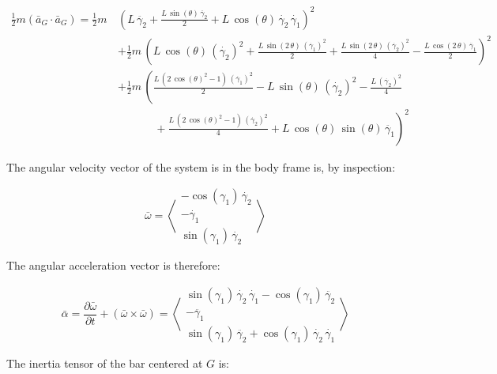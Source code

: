 \documentclass[12pt, letterpaper]{../assignment}
\begin{document}
\begin{equation*}
  \begin{aligned}
    \frac{1}{2}m \left(\bar{a}_G \cdot \bar{a}_G \right) =
\frac{1}{2}m\,&{\left(L\,\ddot{\gamma_2}+\frac{L\,\sin\left(\theta \right)\,\ddot{\gamma_2}}{2}+L\,\cos\left(\theta \right)\,\dot{\gamma_2}\,\dot{\gamma_1}\right)}^2 \\
&+{\frac{1}{2}m\,\left(L\,\cos\left(\theta \right)\,{\left(\dot{\gamma_2}\right)}^2+\frac{L\,\sin\left(2\,\theta \right)\,{\left(\dot{\gamma_1}\right)}^2}{2}+\frac{L\,\sin\left(2\,\theta \right)\,{\left(\dot{\gamma_2}\right)}^2}{4}-\frac{L\,\cos\left(2\,\theta \right)\,\ddot{\gamma_1}}{2}\right)}^2\\
&+\frac{1}{2}m\,\left(\frac{L\,\left(2\,{\cos\left(\theta \right)}^2-1\right)\,{\left(\dot{\gamma_1}\right)}^2}{2}-L\,\sin\left(\theta \right)\,{\left(\dot{\gamma_2}\right)}^2-\frac{L\,{\left(\dot{\gamma_2}\right)}^2}{4}\right.\\
&\ \ \ \ \ \ \ \ \ \ \ \ \ \ \ +\left.\frac{L\,\left(2\,{\cos\left(\theta \right)}^2-1\right)\,{\left(\dot{\gamma_2}\right)}^2}{4}+L\,\cos\left(\theta \right)\,\sin\left(\theta \right)\,\ddot{\gamma_1}\right)^2
\end{aligned}
\end{equation*}

The angular velocity vector of the system is in the body frame is, by inspection:

$$ \bar{\omega} = \left<\begin{array}{c} -\cos\left(\gamma _{1}\right)\,\dot{\gamma_2}\\ -\dot{\gamma_1}\\ \sin\left(\gamma _{1}\right)\,\dot{\gamma_2} \end{array}\right> $$

The angular acceleration vector is therefore:

$$ \bar{\alpha} = \frac{\partial \bar{\omega}}{\partial t} + \left( \bar{\omega} \times \bar{\omega} \right) =
\left<\begin{array}{c} \sin\left(\gamma _{1}\right)\,\dot{\gamma_2}\,\dot{\gamma_1}-\cos\left(\gamma _{1}\right)\,\ddot{\gamma_2}\\ -\ddot{\gamma_1}\\ \sin\left(\gamma _{1}\right)\,\ddot{\gamma_2}+\cos\left(\gamma _{1}\right)\,\dot{\gamma_2}\,\dot{\gamma_1} \end{array}\right> $$

The inertia tensor of the bar centered at $G$ is:
\end{document}
